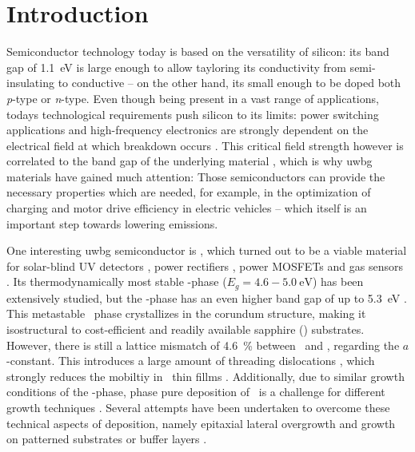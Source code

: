 \chapter{Introduction}
Semiconductor technology today is based on the versatility of silicon: its band gap of \qty{1.1}{\eV} is large enough to allow tayloring its conductivity from semi-insulating to conductive -- on the other hand, its small enough to be doped both \textit{p}-type or \textit{n}-type.
Even though being present in a vast range of applications, todays technological requirements push silicon to its limits:
power switching applications and high-frequency electronics are strongly dependent on the electrical field at which breakdown occurs
    \cite{higashiwaki2018}.
This critical field strength however is correlated to the band gap of the underlying material
    \cite{slobodyan2022},
which is why \acrfull{uwbg} materials have gained much attention:
Those semiconductors can provide the necessary properties which are needed, for example, in the optimization of charging and motor drive efficiency in electric vehicles
    \cite{gupta2024}
-- which itself is an important step towards lowering emissions.

One interesting \acrshort{uwbg} semiconductor is \gao, which turned out to be a viable material for solar-blind UV detectors
    \cite{singhpratiyush2017},
power rectifiers
    \cite{yang2017},
power MOSFETs
    \cite{moser2017}
and gas sensors
    \cite{ogita2001}.
Its thermodynamically most stable \textbeta-phase ($E_g=4.6-\qty{5.0}{\eV}$) has been extensively studied, but the \textalpha-phase has an even higher band gap of up to \qty{5.3}{\eV}
    \cite{hassa2021a}.
This metastable \gao\ phase crystallizes in the corundum structure, making it isostructural to cost-efficient and readily available sapphire (\alo) substrates.
However, there is still a lattice mismatch of \qty{4.6}{\percent} between \agao\ and \alo, regarding the $a$-constant.
This introduces a large amount of threading dislocations
    \cite{kaneko2012},
which strongly reduces the mobiltiy in \agao\ thin fillms
    \cite{takane2023}.
Additionally, due to similar growth conditions of the \textkappa-phase, phase pure deposition of \agao\ is a challenge for different growth techniques
    \cite{bosi2020}.
Several attempts have been undertaken to overcome these technical aspects of deposition, namely epitaxial lateral overgrowth
    \cite{kawara2020}
and growth on patterned substrates
    \cite{nikolaev2020}
or buffer layers
    \cite{jinno2016,jinno2018}.

